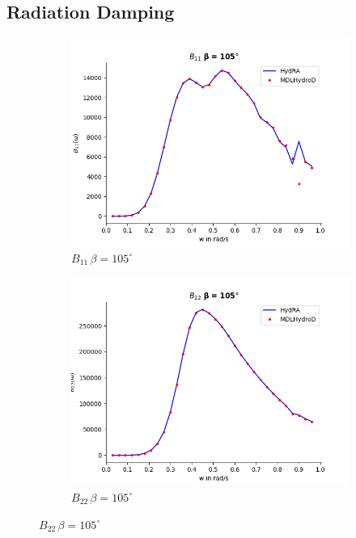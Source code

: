 \subsection{Radiation Damping}
\begin{figure}[H]
    \centering
    \begin{subfigure}[b]{0.45\textwidth}
        \includegraphics[width=\textwidth]{plots/kvlcc/radiation_damp/b11.png}
        \caption{$B_{11} \, \beta = 105^{\circ}$}
    \end{subfigure}
    \begin{subfigure}[b]{0.45\textwidth}
        \includegraphics[width=\textwidth]{plots/kvlcc/radiation_damp/b22.png}
        \caption{$B_{22} \, \beta = 105^{\circ}$}

\end{subfigure}
\end{figure}
